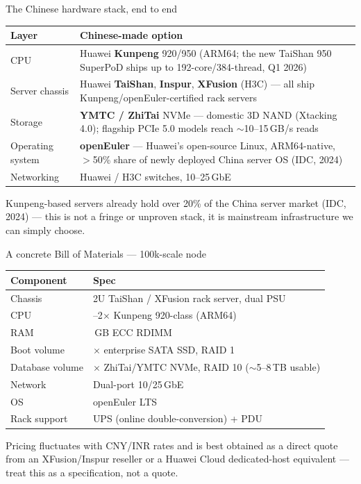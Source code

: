 \documentclass[aspectratio=169,10pt]{beamer}
\begin{document}
\begin{frame}{The Chinese hardware stack, end to end}
  \small
  \renewcommand{\arraystretch}{1.3}
  \begin{tabularx}{\linewidth}{@{}l>{\raggedright\arraybackslash}X@{}}
    \toprule
    \textbf{Layer} & \textbf{Chinese-made option} \\
    \midrule
    CPU & Huawei \textbf{Kunpeng} 920/950 (ARM64; the new TaiShan 950 SuperPoD ships up to 192-core/384-thread, Q1 2026) \\
    Server chassis & Huawei \textbf{TaiShan}, \textbf{Inspur}, \textbf{XFusion} (H3C) --- all ship Kunpeng/openEuler-certified rack servers \\
    Storage & \textbf{YMTC / ZhiTai} NVMe --- domestic 3D NAND (Xtacking 4.0); flagship PCIe 5.0 models reach $\sim$10--15\,GB/s reads \\
    Operating system & \textbf{openEuler} --- Huawei's open-source Linux, ARM64-native, $>$50\% share of newly deployed China server OS (IDC, 2024) \\
    Networking & Huawei / H3C switches, 10--25\,GbE \\
    \bottomrule
  \end{tabularx}
  \begin{takeaway}
    Kunpeng-based servers already hold over 20\% of the China server market (IDC, 2024) --- this is not a fringe or unproven stack, it is mainstream infrastructure we can simply choose.
  \end{takeaway}
\end{frame}

\begin{frame}{A concrete Bill of Materials --- 100k-scale node}
  \small
  \renewcommand{\arraystretch}{1.3}
  \begin{tabularx}{\linewidth}{@{}l>{\raggedright\arraybackslash}X@{}}
    \toprule
    \textbf{Component} & \textbf{Spec} \\
    \midrule
    Chassis & 2U TaiShan / XFusion rack server, dual PSU \\
    CPU & 1--2$\times$ Kunpeng 920-class (ARM64) \\
    RAM & 256\,GB ECC RDIMM \\
    Boot volume & 2$\times$ enterprise SATA SSD, RAID 1 \\
    Database volume & 6$\times$ ZhiTai/YMTC NVMe, RAID 10 ($\sim$5--8\,TB usable) \\
    Network & Dual-port 10/25\,GbE \\
    OS & openEuler LTS \\
    Rack support & UPS (online double-conversion) + PDU \\
    \bottomrule
  \end{tabularx}
  \vspace{12pt}
  {\scriptsize\color{sovGrey} Pricing fluctuates with CNY/INR rates and is best obtained as a direct quote from an XFusion/Inspur reseller or a Huawei Cloud dedicated-host equivalent --- treat this as a specification, not a quote.}
\end{frame}
\end{document}
